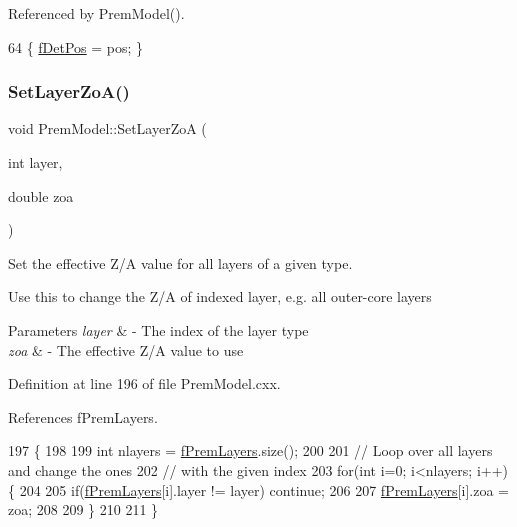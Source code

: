 Referenced by Prem\+Model().


\begin{DoxyCode}
64 \{ \hyperlink{classOscProb_1_1PremModel_ab12ea0343cd11b9233ffd20ab5e620c7}{fDetPos} = pos; \}
\end{DoxyCode}
\mbox{\label{classOscProb_1_1PremModel_ac9887d1af4b3c02925fe3228349f593d}} 
\subsubsection{\texorpdfstring{Set\+Layer\+Zo\+A()}{SetLayerZoA()}}
{\footnotesize\ttfamily void Prem\+Model\+::\+Set\+Layer\+ZoA (\begin{DoxyParamCaption}\item[{int}]{layer,  }\item[{double}]{zoa }\end{DoxyParamCaption})\hspace{0.3cm}{\ttfamily [virtual]}}

Set the effective Z/A value for all layers of a given type.

Use this to change the Z/A of indexed layer, e.\+g. all outer-\/core layers


\begin{DoxyParams}{Parameters}
{\em layer} & -\/ The index of the layer type \\
\hline
{\em zoa} & -\/ The effective Z/A value to use \\
\hline
\end{DoxyParams}


Definition at line 196 of file Prem\+Model.\+cxx.



References f\+Prem\+Layers.


\begin{DoxyCode}
197 \{
198 
199   \textcolor{keywordtype}{int} nlayers = \hyperlink{classOscProb_1_1PremModel_a19a9a3b23ec154ad7a29f92b74aa5bc6}{fPremLayers}.size();
200 
201   \textcolor{comment}{// Loop over all layers and change the ones}
202   \textcolor{comment}{// with the given index}
203   \textcolor{keywordflow}{for}(\textcolor{keywordtype}{int} i=0; i<nlayers; i++)\{
204 
205     \textcolor{keywordflow}{if}(\hyperlink{classOscProb_1_1PremModel_a19a9a3b23ec154ad7a29f92b74aa5bc6}{fPremLayers}[i].layer != layer) \textcolor{keywordflow}{continue};
206 
207     \hyperlink{classOscProb_1_1PremModel_a19a9a3b23ec154ad7a29f92b74aa5bc6}{fPremLayers}[i].zoa = zoa;
208 
209   \}
210 
211 \}
\end{DoxyCode}
\mbox{\label{classOscProb_1_1PremModel_ac5496d6d5bafcf7740c60838d3eee7b3}} 

